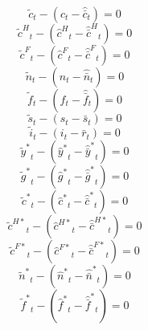 \begin{dmath}
{{\tilde c}}_{t}-\left({{\hat c}}_{t}-{{\hat {\bar c}}}_{t}\right)=0
\end{dmath}
\begin{dmath}
{{\tilde c^H}}_{t}-\left({{\hat c^H}}_{t}-{{\hat {\bar c}^H}}_{t}\right)=0
\end{dmath}
\begin{dmath}
{{\tilde c^F}}_{t}-\left({{\hat c^F}}_{t}-{{\hat {\bar c}^F}}_{t}\right)=0
\end{dmath}
\begin{dmath}
{{\tilde n}}_{t}-\left({{\hat n}}_{t}-{{\hat {\bar n}}}_{t}\right)=0
\end{dmath}
\begin{dmath}
{{\tilde f}}_{t}-\left({{\hat f}}_{t}-{{\hat {\bar f}}}_{t}\right)=0
\end{dmath}
\begin{dmath}
{{\tilde s}}_{t}-\left({{s}}_{t}-{{\bar s}}_{t}\right)=0
\end{dmath}
\begin{dmath}
{{\tilde i}}_{t}-\left({{i}}_{t}-{{\bar r}}_{t}\right)=0
\end{dmath}
\begin{dmath}
{{\tilde y^*}}_{t}-\left({{\hat y^*}}_{t}-{{\hat {\bar y}^*}}_{t}\right)=0
\end{dmath}
\begin{dmath}
{{\tilde g^*}}_{t}-\left({{\hat g^*}}_{t}-{{\hat {\bar g}^*}}_{t}\right)=0
\end{dmath}
\begin{dmath}
{{\tilde c^*}}_{t}-\left({{\hat c^*}}_{t}-{{\hat {\bar c}^*}}_{t}\right)=0
\end{dmath}
\begin{dmath}
{{\tilde c^{H*}}}_{t}-\left({{\hat c^{H*}}}_{t}-{{\hat {\bar c}^{H*}}}_{t}\right)=0
\end{dmath}
\begin{dmath}
{{\tilde c^{F*}}}_{t}-\left({{\hat c^{F*}}}_{t}-{{\hat {\bar c}^{F*}}}_{t}\right)=0
\end{dmath}
\begin{dmath}
{{\tilde n^*}}_{t}-\left({{\hat n^*}}_{t}-{{\hat {\bar n}^*}}_{t}\right)=0
\end{dmath}
\begin{dmath}
{{\tilde f^*}}_{t}-\left({{\hat f^*}}_{t}-{{\hat {\bar f}^*}}_{t}\right)=0
\end{dmath}
